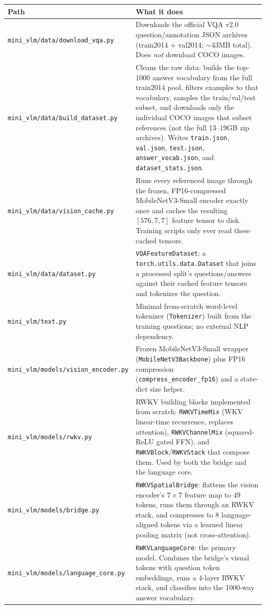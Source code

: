 \documentclass[final]{article}
\begin{document}
\begin{longtable}{p{5.2cm}p{9cm}}
\toprule
Path & What it does \\
\midrule
\endhead
\texttt{mini\_vlm/data/download\_vqa.py} & Downloads the official VQA v2.0 question/annotation JSON archives (train2014 + val2014; $\sim$43MB total). Does \emph{not} download COCO images. \\
\texttt{mini\_vlm/data/build\_dataset.py} & Cleans the raw data: builds the top-1000 answer vocabulary from the full train2014 pool, filters examples to that vocabulary, samples the train/val/test subset, and downloads only the individual COCO images that subset references (not the full 13--19GB zip archives). Writes \texttt{train.json}, \texttt{val.json}, \texttt{test.json}, \texttt{answer\_vocab.json}, and \texttt{dataset\_stats.json}. \\
\texttt{mini\_vlm/data/vision\_cache.py} & Runs every referenced image through the frozen, FP16-compressed MobileNetV3-Small encoder exactly once and caches the resulting $[576,7,7]$ feature tensor to disk. Training scripts only ever read these cached tensors. \\
\texttt{mini\_vlm/data/dataset.py} & \texttt{VQAFeatureDataset}: a \texttt{torch.utils.data.Dataset} that joins a processed split's questions/answers against their cached feature tensors and tokenizes the question. \\
\texttt{mini\_vlm/text.py} & Minimal from-scratch word-level tokenizer (\texttt{Tokenizer}) built from the training questions; no external NLP dependency. \\
\texttt{mini\_vlm/models/vision\_encoder.py} & Frozen MobileNetV3-Small wrapper (\texttt{MobileNetV3Backbone}) plus FP16 compression (\texttt{compress\_encoder\_fp16}) and a state-dict size helper. \\
\texttt{mini\_vlm/models/rwkv.py} & RWKV building blocks implemented from scratch: \texttt{RWKVTimeMix} (WKV linear-time recurrence, replaces attention), \texttt{RWKVChannelMix} (squared-ReLU gated FFN), and \texttt{RWKVBlock}/\texttt{RWKVStack} that compose them. Used by both the bridge and the language core. \\
\texttt{mini\_vlm/models/bridge.py} & \texttt{RWKVSpatialBridge}: flattens the vision encoder's $7\times7$ feature map to 49 tokens, runs them through an RWKV stack, and compresses to 8 language-aligned tokens via a learned linear pooling matrix (not cross-attention). \\
\texttt{mini\_vlm/models/language\_core.py} & \texttt{RWKVLanguageCore}: the primary model. Combines the bridge's visual tokens with question token embeddings, runs a 4-layer RWKV stack, and classifies into the 1000-way answer vocabulary. \\

\end{longtable}
\end{document}
